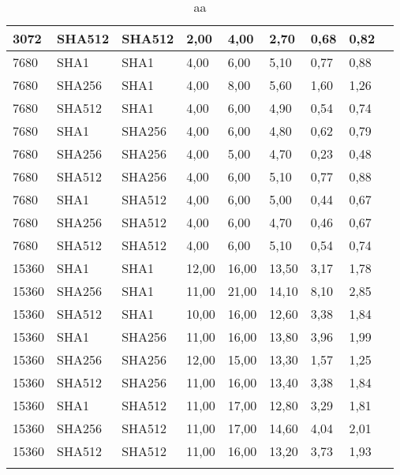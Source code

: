 \begin{longtable}{| l | l | l | l | l |l |l |l |l |}
3072 & SHA512 & SHA512 & 2,00 & 4,00 & 2,70 & 0,68 & 0,82 \\ \hline 
7680 & SHA1 & SHA1 & 4,00 & 6,00 & 5,10 & 0,77 & 0,88 \\ \hline 
7680 & SHA256 & SHA1 & 4,00 & 8,00 & 5,60 & 1,60 & 1,26 \\ \hline 
7680 & SHA512 & SHA1 & 4,00 & 6,00 & 4,90 & 0,54 & 0,74 \\ \hline 
7680 & SHA1 & SHA256 & 4,00 & 6,00 & 4,80 & 0,62 & 0,79 \\ \hline 
7680 & SHA256 & SHA256 & 4,00 & 5,00 & 4,70 & 0,23 & 0,48 \\ \hline 
7680 & SHA512 & SHA256 & 4,00 & 6,00 & 5,10 & 0,77 & 0,88 \\ \hline 
7680 & SHA1 & SHA512 & 4,00 & 6,00 & 5,00 & 0,44 & 0,67 \\ \hline 
7680 & SHA256 & SHA512 & 4,00 & 6,00 & 4,70 & 0,46 & 0,67 \\ \hline 
7680 & SHA512 & SHA512 & 4,00 & 6,00 & 5,10 & 0,54 & 0,74 \\ \hline 
15360 & SHA1 & SHA1 & 12,00 & 16,00 & 13,50 & 3,17 & 1,78 \\ \hline 
15360 & SHA256 & SHA1 & 11,00 & 21,00 & 14,10 & 8,10 & 2,85 \\ \hline 
15360 & SHA512 & SHA1 & 10,00 & 16,00 & 12,60 & 3,38 & 1,84 \\ \hline 
15360 & SHA1 & SHA256 & 11,00 & 16,00 & 13,80 & 3,96 & 1,99 \\ \hline 
15360 & SHA256 & SHA256 & 12,00 & 15,00 & 13,30 & 1,57 & 1,25 \\ \hline 
15360 & SHA512 & SHA256 & 11,00 & 16,00 & 13,40 & 3,38 & 1,84 \\ \hline 
15360 & SHA1 & SHA512 & 11,00 & 17,00 & 12,80 & 3,29 & 1,81 \\ \hline 
15360 & SHA256 & SHA512 & 11,00 & 17,00 & 14,60 & 4,04 & 2,01 \\ \hline 
15360 & SHA512 & SHA512 & 11,00 & 16,00 & 13,20 & 3,73 & 1,93 \\ \hline 
\caption{aa}
\end{longtable}
